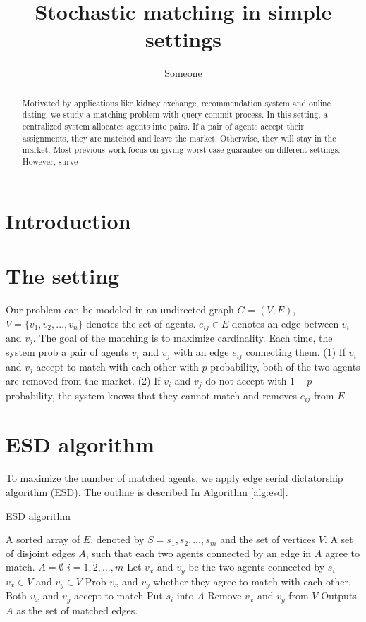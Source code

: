 \documentclass[letterpaper]{article}
\title {Stochastic matching in simple settings}
\author {Someone}
\begin{document}
%

\maketitle
\begin{abstract}
Motivated by applications like kidney exchange, recommendation system  and online dating, we study a matching problem with query-commit process.
In this setting, a centralized system allocates agents into pairs. If a pair of agents accept their assignments, they are matched and leave the market.
Otherwise, they will stay in the market.
Most previous work focus on giving worst case guarantee on different settings. 
However, surve
 


\end{abstract}

\section{Introduction}
\section{The setting}

Our problem can be modeled in an undirected graph $G=(V,E)$, $V=\{v_1,v_2,\ldots,v_n\}$ denotes the set of agents. $e_{ij}\in E$ denotes an edge between $v_i$ and $v_j$.
The goal of the matching is to maximize cardinality. Each time, the system prob a pair of agents $v_i$ and $v_j$ with an edge $e_{ij}$ connecting them. 
(1) If $v_i$ and $v_j$ accept to match with each other with $p$ probability, both of the two agents are removed from the market.
(2) If $v_i$ and $v_j$ do not accept with $1-p$ probability, the system knows that they cannot match and removes $e_{ij}$ from $E$.

\section{ESD algorithm}

To maximize the number of matched agents, we apply edge serial dictatorship algorithm (ESD).
The outline is described In Algorithm \ref{alg:esd}.

\begin{algorithm}
	\caption{ESD algorithm}
	\label{alg:esd}
	\begin{algorithmic}[1]
		\Require
		A sorted array of $E$, denoted by $S=s_1,s_2,\ldots,s_m$ and the set of vertices $V$.
		\Ensure A set of disjoint edges $A$, such that each two agents connected by an edge in $A$ agree to match. 
		\State $A=\emptyset$
		\For $i=1,2,\ldots,m$
		\State Let $v_x$ and $v_y$ be the two agents connected by $s_i$
		\If $v_x\in V$ and $v_y\in V$
		\State Prob $v_x$ and $v_y$ whether they agree to match with each other.
		\If Both $v_x$ and $v_y$ accept to match
		\State Put $s_i$ into $A$
		\State Remove $v_x$ and $v_y$ from $V$
		\EndIf
		\EndIf
		\EndFor
		\State Outputs $A$ as the set of matched edges.
	\end{algorithmic}
\end{algorithm}
\end{document}
